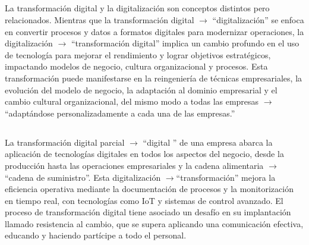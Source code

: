 \subsection*{\boldit{\textcolor{waveBlue1}{Texto 1:}}}
La transformación digital y la  digitalización son conceptos distintos pero relacionados. Mientras que la  \textcolor{samuraiRed}{transformación digital} $\to$ ``digitalización'' se 
enfoca en convertir procesos y datos a formatos digitales para modernizar operaciones, la \textcolor{samuraiRed}{digitalización} $\to$ ``transformación digital'' implica un cambio profundo en el uso de
tecnología para mejorar el rendimiento y lograr objetivos estratégicos, impactando modelos de negocio, cultura organizacional y procesos. 
Esta transformación puede manifestarse en la reingeniería de técnicas empresariales, la evolución del modelo de negocio, 
la adaptación al dominio empresarial y el cambio cultural organizacional, \textcolor{samuraiRed}{del mismo modo a todas las empresas} $\to$ ``adaptándose personalizadamente a cada una de las empresas.''

\subsection*{\boldit{\textcolor{waveBlue1}{Texto 2:}}}
La transformación \textcolor{samuraiRed}{digital parcial} $\to$ ``digital '' de una empresa abarca la aplicación de tecnologías digitales en todos los aspectos del negocio, 
desde la producción hasta las operaciones empresariales y la \textcolor{samuraiRed}{cadena alimentaria} $\to$ ``cadena de suministro''. Esta \textcolor{samuraiRed}{digitalización} $\to$``transformación'' 
mejora la eficiencia operativa mediante la documentación de procesos y la monitorización en tiempo real, con tecnologías como IoT y sistemas de control avanzado. 
El proceso de transformación digital tiene asociado un desafío en su implantación llamado resistencia al cambio, que se supera 
aplicando una comunicación efectiva, educando y haciendo partícipe a todo el personal.


